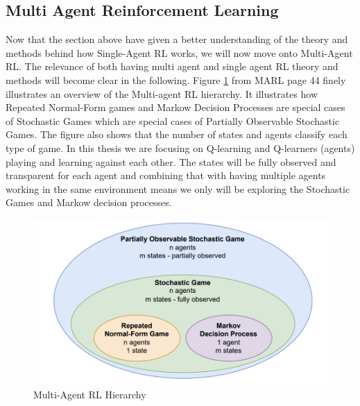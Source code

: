 \documentclass{article}
\begin{document}
\subsection{Multi Agent Reinforcement Learning}
Now that the section above have given a better understanding of the theory and methods behind how Single-Agent RL works, we will now move onto Multi-Agent RL. The relevance of both having multi agent and single agent RL theory and methods will become clear in the following. Figure \ref{fig:marside44} from MARL page 44 finely illustrates an overview of the Multi-agent RL hierarchy. It illustrates how Repeated Normal-Form games and Markow Decision Processes are special cases of Stochastic Games which are special cases of Partially Observable Stochastic Games. The figure also shows that the number of states and agents classify each type of game. In this thesis we are focusing on Q-learning and Q-learners (agents) playing and learning against each other. The states will be fully observed and transparent for each agent and combining that with having multiple agents working in the same environment means we only will be exploring the Stochastic Games and Markow decision processes.
\begin{figure}[H]
    \centering
    \includegraphics[width=0.5\linewidth]{Multi-agent-figure.png}
    \caption{Multi-Agent RL Hierarchy }
    \label{fig:marside44}
\end{figure}
\end{document}
